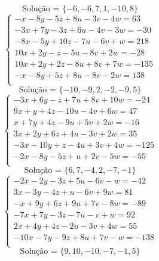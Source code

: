 \documentclass[12pt,oneside,a4paper]{article}
\begin{document}
\begin{equation*}
\text{Solução = }\{-6,-6,7,1,-10,8\}
\end{equation*}
\vspace{\baselineskip}
\begin{equation*}
\begin{cases}
-x-8y-5z+8u-3v-4w=63 \\
-3x+7y-3z+6u-4v-3w=-30 \\
-8x-5y+10z-7u-6v+w=218 \\
10x+2y-z-5u-8v+2w=-28 \\
10x+2y+2z-8u+8v+7w=-135 \\
-x-8y+5z+8u-8v-2w=138 \\
\end{cases}
\end{equation*}
\begin{equation*}
\text{Solução = }\{-10,-9,2,-2,-9,5\}
\end{equation*}
\vspace{\baselineskip}
\begin{equation*}
\begin{cases}
-3x+6y-z+7u+8v+10w=-24 \\
9x+y+4z-10u-4v+6w=47 \\
x+7y+4z-9u+5v+2w=-16 \\
3x+2y+6z+4u-3v+2w=35 \\
-3x-10y+z-4u+3v+4w=-125 \\
-2x-8y-5z+u+2v-5w=-55 \\
\end{cases}
\end{equation*}
\begin{equation*}
\text{Solução = }\{6,7,-4,2,-7,-1\}
\end{equation*}
\vspace{\baselineskip}
\begin{equation*}
\begin{cases}
-2x-2y-3z+5u-6v-w=-42 \\
3x-3y-4z+u-6v+9w=81 \\
-x+9y+6z+9u+7v-8w=-89 \\
-7x+7y-3z-7u-v+w=92 \\
2x+4y+4z-2u-3v+4w=55 \\
-10x-7y-9z+8u+7v-w=-138 \\
\end{cases}
\end{equation*}
\begin{equation*}
\text{Solução = }\{9,10,-10,-7,-1,5\}
\end{equation*}
\end{document}
